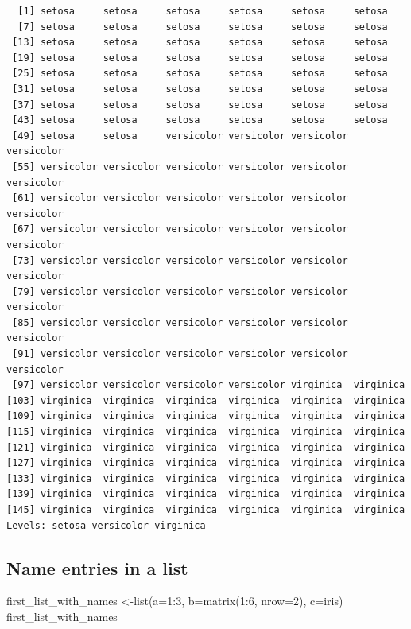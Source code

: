 \documentclass[
  letterpaper,
  DIV=11,
  numbers=noendperiod]{scrreprt}
\newenvironment{Shaded}{\begin{snugshade}}{\end{snugshade}}
\newcommand{\AttributeTok}[1]{\textcolor[rgb]{0.40,0.45,0.13}{#1}}
\newcommand{\DecValTok}[1]{\textcolor[rgb]{0.68,0.00,0.00}{#1}}
\newcommand{\FunctionTok}[1]{\textcolor[rgb]{0.28,0.35,0.67}{#1}}
\newcommand{\NormalTok}[1]{\textcolor[rgb]{0.00,0.23,0.31}{#1}}
\newcommand{\OtherTok}[1]{\textcolor[rgb]{0.00,0.23,0.31}{#1}}
\newcommand{\SpecialCharTok}[1]{\textcolor[rgb]{0.37,0.37,0.37}{#1}}
\begin{document}
\begin{verbatim}
  [1] setosa     setosa     setosa     setosa     setosa     setosa    
  [7] setosa     setosa     setosa     setosa     setosa     setosa    
 [13] setosa     setosa     setosa     setosa     setosa     setosa    
 [19] setosa     setosa     setosa     setosa     setosa     setosa    
 [25] setosa     setosa     setosa     setosa     setosa     setosa    
 [31] setosa     setosa     setosa     setosa     setosa     setosa    
 [37] setosa     setosa     setosa     setosa     setosa     setosa    
 [43] setosa     setosa     setosa     setosa     setosa     setosa    
 [49] setosa     setosa     versicolor versicolor versicolor versicolor
 [55] versicolor versicolor versicolor versicolor versicolor versicolor
 [61] versicolor versicolor versicolor versicolor versicolor versicolor
 [67] versicolor versicolor versicolor versicolor versicolor versicolor
 [73] versicolor versicolor versicolor versicolor versicolor versicolor
 [79] versicolor versicolor versicolor versicolor versicolor versicolor
 [85] versicolor versicolor versicolor versicolor versicolor versicolor
 [91] versicolor versicolor versicolor versicolor versicolor versicolor
 [97] versicolor versicolor versicolor versicolor virginica  virginica 
[103] virginica  virginica  virginica  virginica  virginica  virginica 
[109] virginica  virginica  virginica  virginica  virginica  virginica 
[115] virginica  virginica  virginica  virginica  virginica  virginica 
[121] virginica  virginica  virginica  virginica  virginica  virginica 
[127] virginica  virginica  virginica  virginica  virginica  virginica 
[133] virginica  virginica  virginica  virginica  virginica  virginica 
[139] virginica  virginica  virginica  virginica  virginica  virginica 
[145] virginica  virginica  virginica  virginica  virginica  virginica 
Levels: setosa versicolor virginica
\end{verbatim}

\subsection{Name entries in a list}\label{name-entries-in-a-list}

\begin{Shaded}
\begin{Highlighting}[]
\NormalTok{first\_list\_with\_names }\OtherTok{\textless{}{-}}\FunctionTok{list}\NormalTok{(}\AttributeTok{a=}\DecValTok{1}\SpecialCharTok{:}\DecValTok{3}\NormalTok{, }\AttributeTok{b=}\FunctionTok{matrix}\NormalTok{(}\DecValTok{1}\SpecialCharTok{:}\DecValTok{6}\NormalTok{, }\AttributeTok{nrow=}\DecValTok{2}\NormalTok{), }\AttributeTok{c=}\NormalTok{iris)}
\NormalTok{first\_list\_with\_names}
\end{Highlighting}
\end{Shaded}
\end{document}
